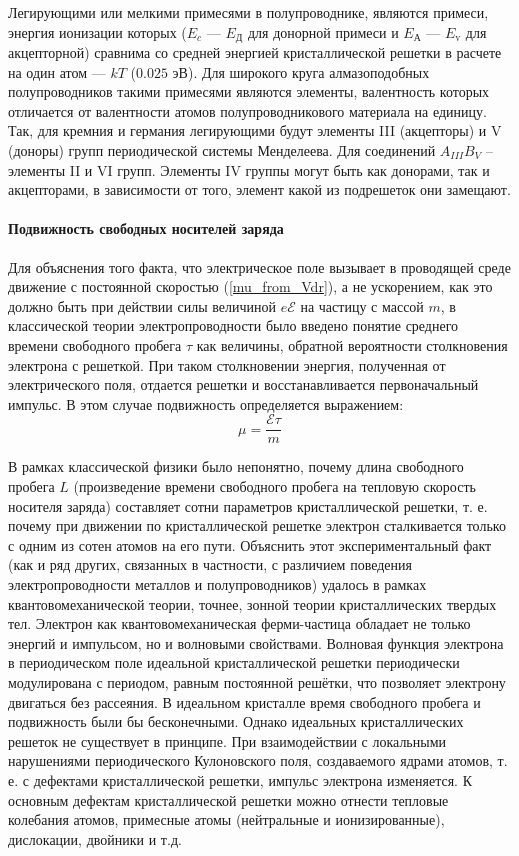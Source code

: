 Легирующими или мелкими примесями в полупроводнике, являются примеси, энергия ионизации которых ($E_{c}$ — $E_{\text{Д}}$ для донорной примеси и $E_{\text{А}}$ — $E_{\text{v}}$ для акцепторной) сравнима со средней энергией кристаллической решетки в расчете на один атом — $kT$ ($0.025$ эВ). Для широкого круга алмазоподобных полупроводников такими примесями являются элементы, валентность которых отличается от валентности атомов полупроводникового материала на единицу. Так, для кремния и германия легирующими будут элементы III (акцепторы) и V (доноры) групп периодической системы Менделеева. Для соединений $A_{III}B_{V}$ – элементы II и VI групп. Элементы IV группы могут быть как донорами, так и акцепторами, в зависимости от того, элемент какой из подрешеток они замещают.

\paragraph{Подвижность свободных носителей заряда}

Для объяснения того факта, что электрическое поле вызывает в проводящей среде движение с постоянной скоростью (\ref{mu_from_Vdr}), а не ускорением, как это должно быть при действии силы величиной $e \mathcal{E}$ на частицу с массой $m$, в классической теории электропроводности было введено понятие среднего времени свободного пробега $\tau$ как величины, обратной вероятности столкновения электрона с решеткой. При таком столкновении энергия, полученная от электрического поля, отдается решетки и восстанавливается первоначальный импульс. В этом случае подвижность определяется выражением:
\begin{equation}
\mu = \frac{\mathcal{E} \tau}{m}
\label{mu_from_E}
\end{equation}

В рамках классической физики было непонятно, почему длина свободного пробега $L$ (произведение времени свободного пробега на тепловую скорость носителя заряда) составляет сотни параметров кристаллической решетки, т. е. почему при движении по кристаллической решетке электрон сталкивается только с одним из сотен атомов на его пути. Объяснить этот экспериментальный факт (как и ряд других, связанных в частности, с различием поведения электропроводности металлов и полупроводников) удалось в рамках квантовомеханической теории, точнее, зонной теории кристаллических твердых тел. Электрон как квантовомеханическая ферми-частица обладает не только энергий и импульсом, но и волновыми свойствами. Волновая функция электрона в периодическом поле идеальной кристаллической решетки периодически модулирована с периодом, равным постоянной решётки, что позволяет электрону двигаться без рассеяния. В идеальном кристалле время свободного пробега и подвижность были бы бесконечными. Однако идеальных кристаллических решеток не существует в принципе. При взаимодействии с локальными нарушениями периодического Кулоновского поля, создаваемого ядрами атомов, т. е. с дефектами кристаллической решетки, импульс электрона изменяется. К основным дефектам кристаллической решетки можно отнести тепловые колебания атомов, примесные атомы (нейтральные и ионизированные), дислокации, двойники и т.д.

